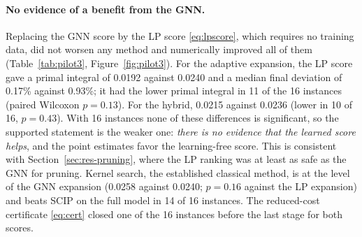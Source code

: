 \begin{table}[t]\centering\small
\caption{Third validation pilot (16 instances, $30\times150$, $T=60$~s; seeds averaged within
instance). Columns as in Table~\ref{tab:pilot2}. \emph{Learned}: whether any component of the
method was trained. Rows sorted by $P$.}\label{tab:pilot3}
\end{table}

\paragraph{No evidence of a benefit from the GNN.} Replacing the GNN score by the LP score \eqref{eq:lpscore},
which requires no training data, did not worsen any method and numerically improved all of them
(Table~\ref{tab:pilot3}, Figure~\ref{fig:pilot3}). For the adaptive expansion, the LP score gave
a primal integral of 0.0192 against 0.0240 and a median final deviation of 0.17\% against 0.93\%;
it had the lower primal integral in 11 of the 16 instances (paired Wilcoxon $p=0.13$). For the
hybrid, 0.0215 against 0.0236 (lower in 10 of 16, $p=0.43$). With 16 instances none of these
differences is significant, so the supported statement is the weaker one: \emph{there is no
evidence that the learned score helps}, and the point estimates favor the learning-free score.
This is consistent with Section~\ref{sec:res-pruning}, where the LP ranking was at least as safe
as the GNN for pruning. Kernel search, the established classical method, is at the level of the
GNN expansion (0.0258 against 0.0240; $p=0.16$ against the LP expansion) and beats SCIP on the
full model in 14 of 16 instances. The reduced-cost certificate \eqref{eq:cert} closed one of the
16 instances before the last stage for both scores.

